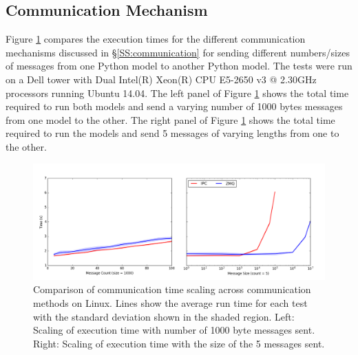 \documentclass[journal]{IEEEtran}
\begin{document}
\subsection{Communication Mechanism}\label{SS:results_commtype}
%
Figure \ref{fig:commtype} compares the execution times for the different communication mechanisms discussed in \S\ref{SS:communication} for sending different numbers/sizes of messages from one Python model to another Python model. The tests were run on a Dell tower with Dual Intel(R) Xeon(R) CPU E5-2650 v3 @ 2.30GHz processors running Ubuntu 14.04. The left panel of Figure \ref{fig:commtype} shows the total time required to run both models and send a varying number of 1000 bytes messages from one model to the other. The right panel of Figure \ref{fig:commtype} shows the total time required to run the models and send 5 messages of varying lengths from one to the other. 
%
\ifinclfig
 	\begin{figure}[htbp]
	\begin{center}
	\includegraphics[width=\columnwidth,keepaspectratio]{./images/scaling_commtype.png}
	\caption{Comparison of communication time scaling across communication methods on Linux. Lines show the average run time for each test with the standard deviation shown in the shaded region. Left: Scaling of execution time with number of 1000 byte messages sent. Right: Scaling of execution time with the size of the 5 messages sent.}
	\label{fig:commtype}
	\end{center}
	\end{figure}
\fi
%
\end{document}
